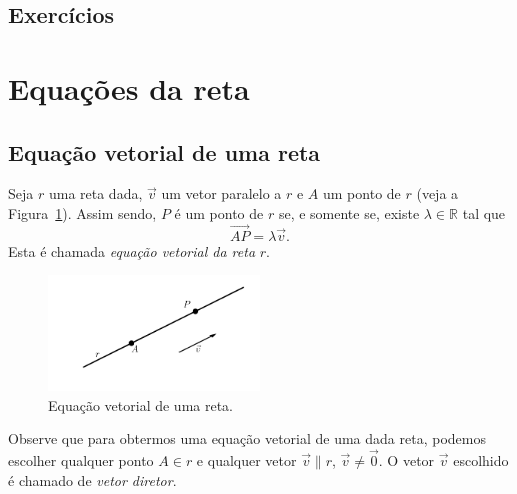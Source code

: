 \subsection*{Exercícios}

\emconstrucao

\section{Equações da reta}\label{cap_ert_sec_eqsreta}

\subsection{Equação vetorial de uma reta}

Seja $r$ uma reta dada, $\vec{v}$ um vetor paralelo a $r$ e $A$ um ponto de $r$ (veja a Figura~\ref{fig:er_vet}). Assim sendo, $P$ é um ponto de $r$ se, e somente se, existe $\lambda\in\mathbb{R}$ tal que
\begin{equation}
  \overrightarrow{AP} = \lambda\vec{v}.
\end{equation}
Esta é chamada \emph{equação vetorial da reta} $r$.

\begin{figure}[H]
  \centering
  \includegraphics[width=0.5\textwidth]{./cap_erp/dados/fig_er_vet/fig_er_vet}
  \caption{Equação vetorial de uma reta.}
  \label{fig:er_vet}
\end{figure}

Observe que para obtermos uma equação vetorial de uma dada reta, podemos escolher qualquer ponto $A\in r$ e qualquer vetor $\vec{v}\parallel r$, $\vec{v}\neq\vec{0}$. O vetor $\vec{v}$ escolhido é chamado de \emph{vetor diretor}.

